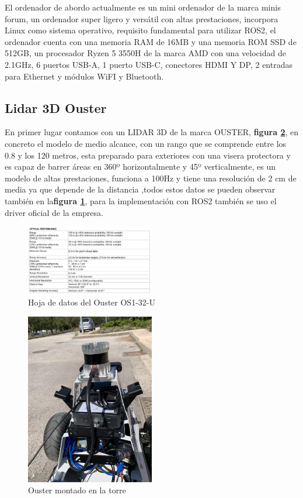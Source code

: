 El ordenador de abordo actualmente es un mini ordenador de la marca minis forum, un ordenador super ligero y versátil con altas 
prestaciones, incorpora Linux como sistema operativo, requisito fundamental para utilizar ROS2, el ordenador cuenta con una 
memoria RAM de 16MB y una memoria ROM SSD de 512GB, un procesador Ryzen 5 3550H de la marca AMD con una velocidad de 2.1GHz, 6 puertos USB-A, 
1 puerto USB-C, conectores HDMI Y DP, 2 entradas para Ethernet y módulos WiFI y Bluetooth.

\subsection{Lidar 3D Ouster}
En primer lugar contamos con un LIDAR 3D de la marca OUSTER, \textbf{figura \ref{fig:ouster_hunter}}, en concreto el 
modelo de medio alcance, con un rango que se comprende entre los 0.8 y los 120 metros, esta preparado para exteriores con una visera 
protectora y es capaz de barrer áreas en 360º horizontalmente y 45º verticalmente, es un modelo de altas prestaciones, funciona a 
100Hz y tiene una resolución de 2 cm de media ya que depende de la distancia ,todos estos datos se pueden observar también en la\textbf{figura \ref{fig:datasheet_ouster}}, 
para la implementación con ROS2 también se uso el driver oficial de la empresa. 

\begin{figure}[h]
    \centering
    \includegraphics[width=0.5\textwidth]{images/osuter_datasheet.png}
    \caption{Hoja de datos del Ouster OS1-32-U}
    \label{fig:datasheet_ouster}
\end{figure}

\begin{figure}[H]
    \centering
    \includegraphics[width=0.5\textwidth]{images/ouster_hunter.jpeg}
    \caption{Ouster montado en la torre}
    \label{fig:ouster_hunter}
\end{figure}

